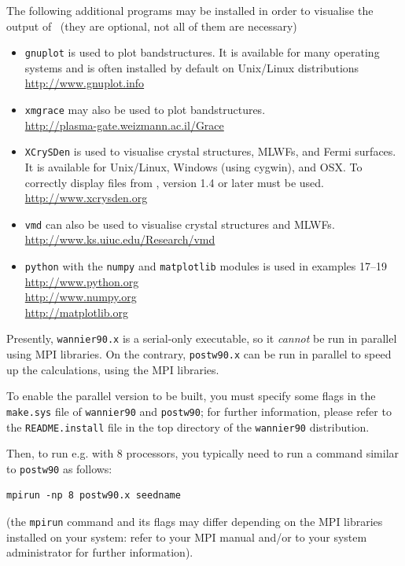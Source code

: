 \documentclass[a4paper,11pt,twoside]{article}
\begin{document}
The following additional programs may be installed in order to
visualise the output of \wannier\ (they are optional, not all of them
are necessary)
\begin{itemize}
\item {\tt gnuplot} is used to plot bandstructures. It is 
available for many operating systems and is often installed by default on
 Unix/Linux distributions\\
\url{http://www.gnuplot.info}
\item {\tt xmgrace} may also be used to plot bandstructures.\\
\url{http://plasma-gate.weizmann.ac.il/Grace}
\item {\tt XCrySDen} is used to visualise crystal structures, MLWFs,
  and Fermi surfaces. It is available for Unix/Linux, 
  Windows (using cygwin), and OSX. To correctly display 
files from \wannier, version 1.4 or later must be used.\\
\url{http://www.xcrysden.org}
\item {\tt vmd} can also be used to visualise crystal structures and
  MLWFs.\\
\url{http://www.ks.uiuc.edu/Research/vmd}
\item{\tt python} with the {\tt numpy} and {\tt matplotlib} modules
  is used in examples 17--19\\
  \url{http://www.python.org}\\
  \url{http://www.numpy.org}\\
  \url{http://matplotlib.org}
\end{itemize}

\label{sec:parallel}
Presently, {\tt wannier90.x} is a serial-only executable, so it
\emph{cannot} be run in parallel using MPI libraries. On the contrary,
{\tt postw90.x} can be run in parallel to speed up the calculations,
using the MPI libraries.

To enable the parallel version to be built, you must specify some
flags in the {\tt make.sys} file of {\tt wannier90} and {\tt postw90};
for further information, please refer to the {\tt README.install} file
in the top directory of the {\tt wannier90} distribution.

Then, to run e.g. with 8 processors, you typically need to run a
command similar to {\tt postw90} as follows:
\begin{verbatim}
mpirun -np 8 postw90.x seedname
\end{verbatim}
(the {\tt mpirun} command and its flags may differ depending on the
MPI libraries installed on your system: refer to your MPI manual and/or to
your system administrator for further information).
\end{document}
